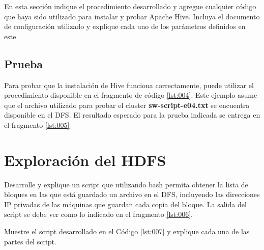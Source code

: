 \documentclass[9pt,letterpaper,twoside]{article}
\begin{document}
{\color{red} En esta sección indique el procedimiento desarrollado y agregue cualquier código que haya sido utilizado para instalar y probar Apache Hive. Incluya el documento de configuración utilizado y explique cada uno de los parámetros definidos en este.}

\subsection{Prueba}

{\color{red} Para probar que la instalación de Hive funciona correctamente, puede utilizar el procedimiento disponible en el fragmento de código \ref{lst:004}. Este ejemplo asume que el archivo utilizado para probar el cluster \textbf{sw-script-e04.txt} se encuentra disponible en el DFS. El resultado esperado para la prueba indicada se entrega en el fragmento \ref{lst:005}}

\begin{code}[H]

\end{code}

\begin{code}[H]

\end{code}

\section{Exploración del HDFS}

{\color{red} Desarrolle y explique un script que utilizando bash permita obtener la lista de bloques en las que está guardado un archivo en el DFS, incluyendo las direcciones IP privadas de las máquinas que guardan cada copia del bloque. La salida del script se debe ver como lo indicado en el fragmento \ref{lst:006}.}

\begin{code}[H]

\end{code}

{\color{red} Muestre el script desarrollado en el Código \ref{lst:007} y explique cada una de las partes del script.}
\end{document}
